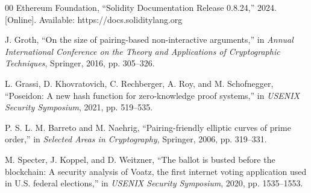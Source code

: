 \documentclass[conference]{IEEEtran}
\begin{document}
\begin{thebibliography}{00}
Ethereum Foundation, ``Solidity Documentation Release 0.8.24,'' 2024. [Online]. Available: https://docs.soliditylang.org

J. Groth, ``On the size of pairing-based non-interactive arguments,'' in \textit{Annual International Conference on the Theory and Applications of Cryptographic Techniques}, Springer, 2016, pp. 305--326.

L. Grassi, D. Khovratovich, C. Rechberger, A. Roy, and M. Schofnegger, ``Poseidon: A new hash function for zero-knowledge proof systems,'' in \textit{USENIX Security Symposium}, 2021, pp. 519--535.

P. S. L. M. Barreto and M. Naehrig, ``Pairing-friendly elliptic curves of prime order,'' in \textit{Selected Areas in Cryptography}, Springer, 2006, pp. 319--331.

M. Specter, J. Koppel, and D. Weitzner, ``The ballot is busted before the blockchain: A security analysis of Voatz, the first internet voting application used in U.S. federal elections,'' in \textit{USENIX Security Symposium}, 2020, pp. 1535--1553.

\end{thebibliography}
\end{document}
